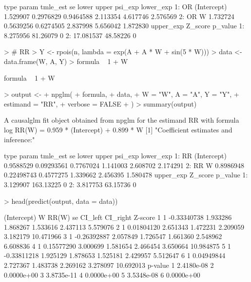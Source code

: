 \documentclass{article}
\begin{document}
\begin{Schunk}
\begin{Soutput}
   type       param tmle_est        se     lower    upper  psi_exp lower_exp
1:   OR (Intercept) 1.529907 0.2976829 0.9464588 2.113354 4.617746  2.576569
2:   OR           W 1.732724 0.5639256 0.6274505 2.837998 5.656042  1.872830
   upper_exp  Z_score p_value
1:  8.275956 81.26079       0
2: 17.081537 48.58226       0
\end{Soutput}
\begin{Sinput}
> # RR
> Y <- rpois(n, lambda = exp(A + A * W + sin(5 * W)))
> data <- data.frame(W, A, Y)
> formula ~ 1 + W
\end{Sinput}
\begin{Soutput}
formula ~ 1 + W
\end{Soutput}
\begin{Sinput}
> output <-
+   npglm(
+     formula,
+     data,
+     W = "W", A = "A", Y = "Y",
+     estimand = "RR",
+     verbose = FALSE
+   )
> summary(output)
\end{Sinput}
\begin{Soutput}
A causalglm fit object obtained from npglm for the estimand RR with formula 
log RR(W) = 0.959 * (Intercept) + 0.899 * W
[1] "Coefficient estimates and inference:"

   type       param  tmle_est         se     lower    upper  psi_exp lower_exp
1:   RR (Intercept) 0.9588529 0.09293561 0.7767024 1.141003 2.608702  2.174291
2:   RR           W 0.8986948 0.22498743 0.4577275 1.339662 2.456395  1.580478
   upper_exp   Z_score p_value
1:  3.129907 163.13225       0
2:  3.817753  63.15736       0
\end{Soutput}
\begin{Sinput}
> head(predict(output, data = data))
\end{Sinput}
\begin{Soutput}
  (Intercept)           W    RR(W)       se  CI_left CI_right   Z-score
1           1 -0.33340738 1.933286 1.868267 1.533616 2.437113  5.579076
2           1  0.01804120 2.651343 1.472231 2.209059 3.182179 10.471966
3           1 -0.26392887 2.057849 1.726547 1.661360 2.548962  6.608836
4           1  0.15577290 3.000699 1.581654 2.466454 3.650664 10.984875
5           1 -0.33811218 1.925129 1.878653 1.525181 2.429957  5.512647
6           1  0.04949844 2.727367 1.483738 2.269162 3.278097 10.692013
     p-value
1 2.4180e-08
2 0.0000e+00
3 3.8735e-11
4 0.0000e+00
5 3.5348e-08
6 0.0000e+00
\end{Soutput}
\end{Schunk}
\end{document}
